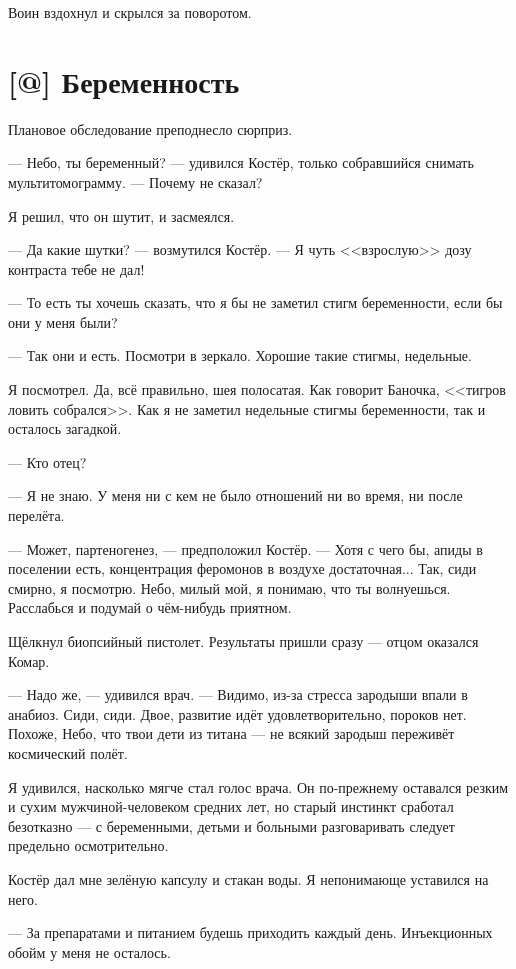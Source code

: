 Воин вздохнул и скрылся за поворотом.

\section{[@] Беременность}

Плановое обследование преподнесло сюрприз.

--- Небо, ты беременный? --- удивился Костёр, только собравшийся снимать мультитомограмму.
--- Почему не сказал?

Я решил, что он шутит, и засмеялся.

--- Да какие шутки? --- возмутился Костёр.
--- Я чуть <<взрослую>> дозу контраста тебе не дал!

--- То есть ты хочешь сказать, что я бы не заметил стигм беременности, если бы они у меня были?

--- Так они и есть.
Посмотри в зеркало.
Хорошие такие стигмы, недельные.

Я посмотрел.
Да, всё правильно, шея полосатая.
Как говорит Баночка, <<тигров ловить собрался>>.
Как я не заметил недельные стигмы беременности, так и осталось загадкой.

--- Кто отец?

--- Я не знаю.
У меня ни с кем не было отношений ни во время, ни после перелёта.

--- Может, партеногенез, --- предположил Костёр.
--- Хотя с чего бы, апиды в поселении есть, концентрация феромонов в воздухе достаточная...
Так, сиди смирно, я посмотрю.
Небо, милый мой, я понимаю, что ты волнуешься.
Расслабься и подумай о чём-нибудь приятном.

Щёлкнул биопсийный пистолет.
Результаты пришли сразу --- отцом оказался Комар.

--- Надо же, --- удивился врач.
--- Видимо, из-за стресса зародыши впали в анабиоз.
Сиди, сиди.
Двое, развитие идёт удовлетворительно, пороков нет.
Похоже, Небо, что твои дети из титана --- не всякий зародыш переживёт космический полёт.

Я удивился, насколько мягче стал голос врача.
Он по-прежнему оставался резким и сухим мужчиной-человеком средних лет, но старый инстинкт сработал безотказно --- с беременными, детьми и больными разговаривать следует предельно осмотрительно.

Костёр дал мне зелёную капсулу и стакан воды.
Я непонимающе уставился на него.

--- За препаратами и питанием будешь приходить каждый день.
Инъекционных обойм у меня не осталось.

